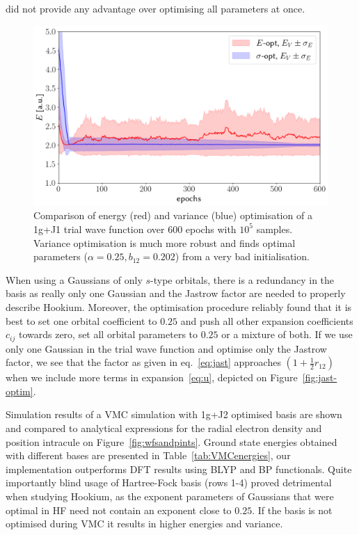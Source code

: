 \documentclass[final,3p,times,twocolumn]{elsarticle}
\begin{document}
	\afterpage{\FloatBarrier}
	\noindent
	did not provide any advantage over optimising all parameters at once.
	
	\begin{figure}
		\centering
		\includegraphics[width=\linewidth]{../plots/vmc-opt-1g.png}
		\caption{Comparison of energy (red) and variance (blue) optimisation of a 1g+J1 trial wave function over 600 epochs with $10^5$ samples. Variance optimisation is much more robust and finds optimal parameters ($\alpha = 0.25, b_{12} = 0.202$) from a very bad initialisation.}
		\label{fig:basic-optim}
	\end{figure}

	When using a Gaussians of only $s$-type orbitals, there is a redundancy in the basis as really only one Gaussian and the Jastrow factor are needed to properly describe Hookium. Moreover, the optimisation procedure reliably found that it is best to set one orbital coefficient to $0.25$ and push all other expansion coefficients $c_{ij}$ towards zero, set all orbital parameters to $0.25$ or a mixture of both. If we use only one Gaussian in the trial wave function and optimise only the Jastrow factor, we see that the factor as given in eq.~\eqref{eq:jast} approaches $(1 + \frac{1}{2}r_{12})$ when we include more terms in expansion~\eqref{eq:u}, depicted on Figure~\ref{fig:jast-optim}.
	
	Simulation results of a VMC simulation with 1g+J2 optimised basis are shown and compared to analytical expressions for the radial electron density and position intracule on Figure~\ref{fig:wfsandpints}. Ground state energies obtained with different bases are presented in Table~\ref{tab:VMCenergies}, our implementation outperforms DFT results using BLYP and BP functionals. Quite importantly blind usage of Hartree-Fock basis (rows 1-4) proved detrimental when studying Hookium, as the exponent parameters of Gaussians that were optimal in HF need not contain an exponent close to $0.25$. If the basis is not optimised during VMC it results in higher energies and variance.
	
\end{document}
